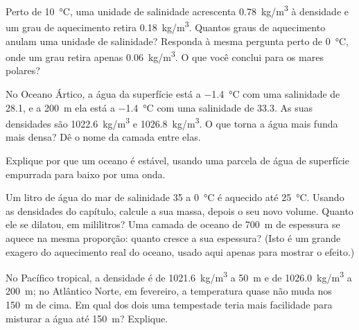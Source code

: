 \begin{exercise}[$\star\star$]\label{exo:g10:layered-ocean:9}
Perto de \qty{10}{\degreeCelsius}, uma unidade de salinidade acrescenta
\qty{0.78}{kg/m^3} à densidade e um grau de aquecimento retira
\qty{0.18}{kg/m^3}. Quantos graus de aquecimento anulam uma unidade de
salinidade? Responda à mesma pergunta perto de \qty{0}{\degreeCelsius}, onde
um grau retira apenas \qty{0.06}{kg/m^3}. O que você conclui para os mares
polares?
\end{exercise}

\begin{exercise}[$\star\star$]\label{exo:g10:layered-ocean:10}
No Oceano Ártico, a água da superfície está a \qty{-1.4}{\degreeCelsius}
com uma salinidade de 28.1, e a \qty{200}{m} ela está a
\qty{-1.4}{\degreeCelsius} com uma salinidade de 33.3. As suas densidades são
\qty{1022.6}{kg/m^3} e \qty{1026.8}{kg/m^3}. O que torna a água mais funda
mais densa? Dê o nome da camada entre elas.
\end{exercise}

\begin{exercise}[$\star\star$]\label{exo:g10:layered-ocean:11}
Explique por que um oceano  é estável, usando uma parcela de
água de superfície empurrada para baixo por uma onda.
\end{exercise}

\begin{exercise}[$\star\star\star$]\label{exo:g10:layered-ocean:12}
Um litro de água do mar de salinidade 35 a \qty{0}{\degreeCelsius} é
aquecido até \qty{25}{\degreeCelsius}. Usando as densidades do capítulo,
calcule a sua massa, depois o seu novo volume. Quanto ele se dilatou, em
mililitros? Uma camada de oceano de \qty{700}{m} de espessura se aquece na
mesma proporção: quanto cresce a sua espessura? (Isto é um grande exagero do
aquecimento real do oceano, usado aqui apenas para mostrar o efeito.)
\end{exercise}

\begin{exercise}[$\star\star\star$]\label{exo:g10:layered-ocean:13}
No Pacífico tropical, a densidade é de \qty{1021.6}{kg/m^3} a \qty{50}{m} e
de \qty{1026.0}{kg/m^3} a \qty{200}{m}; no Atlântico Norte, em fevereiro, a
temperatura quase não muda nos \qty{150}{m} de cima. Em qual dos dois uma
tempestade teria mais facilidade para misturar a água até \qty{150}{m}?
Explique.
\end{exercise}

